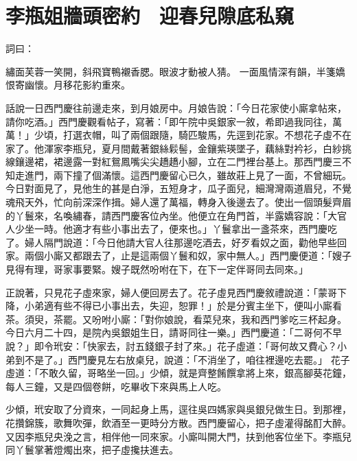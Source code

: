 %

\chapter{李瓶姐牆頭密約　迎春兒隙底私窺}

詞曰：

繡面芙蓉一笑開，斜飛寶鴨襯香腮。眼波才動被人猜。
一面風情深有韻，半箋嬌恨寄幽懷。月移花影約重來。

話說一日西門慶往前邊走來，到月娘房中。月娘告說：「今日花家使小廝拿帖來，請你吃酒。」西門慶觀看帖子，寫著：「即午院中吳銀家一敘，希即過我同往，萬萬！」少頃，打選衣帽，叫了兩個跟隨，騎匹駿馬，先逕到花家。不想花子虛不在家了。他渾家李瓶兒，夏月間戴著銀絲鬏髻，金鑲紫瑛墜子，藕絲對衿衫，白紗挑線鑲邊裙，裙邊露一對紅鴛鳳嘴尖尖趫趫小腳，立在二門裡台基上。那西門慶三不知走進門，兩下撞了個滿懷。這西門慶留心已久，雖故莊上見了一面，不曾細玩。今日對面見了，見他生的甚是白淨，五短身才，瓜子面兒，細灣灣兩道眉兒，不覺魂飛天外，忙向前深深作揖。婦人還了萬福，轉身入後邊去了。使出一個頭髮齊眉的丫鬟來，名喚繡春，請西門慶客位內坐。他便立在角門首，半露嬌容說：「大官人少坐一時。他適才有些小事出去了，便來也。」丫鬟拿出一盞茶來，西門慶吃了。婦人隔門說道：「今日他請大官人往那邊吃酒去，好歹看奴之面，勸他早些回家。兩個小廝又都跟去了，止是這兩個丫鬟和奴，家中無人。」西門慶便道：「嫂子見得有理，哥家事要緊。嫂子既然吩咐在下，在下一定伴哥同去同來。」

正說著，只見花子虛來家，婦人便回房去了。花子虛見西門慶敘禮說道：「蒙哥下降，小弟適有些不得已小事出去，失迎，恕罪！」於是分賓主坐下，便叫小廝看茶。須臾，茶罷。又吩咐小廝：「對你娘說，看菜兒來，我和西門爹吃三杯起身。今日六月二十四，是院內吳銀姐生日，請哥同往一樂。」西門慶道：「二哥何不早說？」即令玳安：「快家去，討五錢銀子封了來。」花子虛道：「哥何故又費心？小弟到不是了。」西門慶見左右放桌兒，說道：「不消坐了，咱往裡邊吃去罷。」 花子虛道：「不敢久留，哥略坐一回。」少傾，就是齊整餚饌拿將上來，銀高腳葵花鐘，每人三鐘，又是四個卷餅，吃畢收下來與馬上人吃。

少傾，玳安取了分資來，一同起身上馬，逕往吳四媽家與吳銀兒做生日。到那裡，花攢錦簇，歌舞吹彈，飲酒至一更時分方散。西門慶留心，把子虛灌得酩酊大醉。又因李瓶兒央浼之言，相伴他一同來家。小廝叫開大門，扶到他客位坐下。李瓶兒同丫鬟掌著燈燭出來，把子虛攙扶進去。

